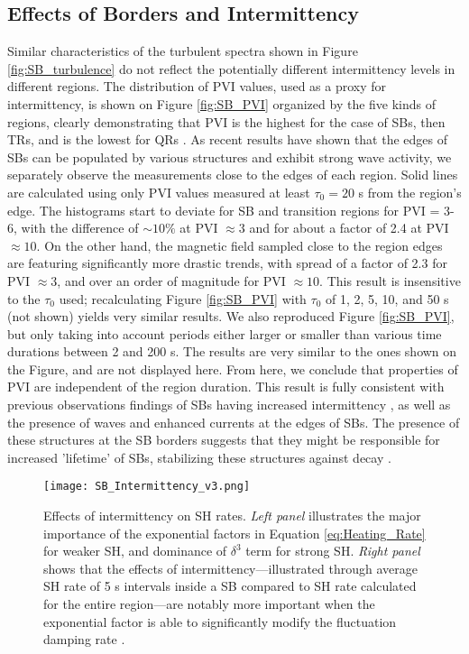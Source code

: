 \documentclass[]{aastex62}
\begin{document}
\subsection{Effects of Borders and Intermittency}
\label{sec:Results_Intermittency}

Similar characteristics of the turbulent spectra shown in Figure \ref{fig:SB_turbulence} do not reflect the potentially different intermittency levels in different regions. The distribution of PVI values, used as a proxy for intermittency, is shown on Figure \ref{fig:SB_PVI} organized by the five kinds of regions, clearly demonstrating that PVI is the highest for the case of SBs, then TRs, and is the lowest for QRs \citep{Huang_2020_A&A}. As recent results \citep{Krasnoselskikh_2020_ApJ,Agapitov_2020_ApJL,Farrell_2020_ApJS} have shown that the edges of SBs can be populated by various structures and exhibit strong wave activity, we separately observe the measurements close to the edges of each region. Solid lines are calculated using only PVI values measured at least $\tau_0 = 20$ s from the region's edge. The histograms start to deviate for SB and transition regions for PVI = 3-6, with the difference of $\sim 10\%$ at PVI $\approx 3$ and for about a factor of 2.4 at PVI $\approx 10$. On the other hand, the magnetic field sampled close to the region edges are featuring significantly more drastic trends, with spread of a factor of 2.3 for PVI $\approx 3$, and over an order of magnitude for PVI $\approx 10$. This result is insensitive to the $\tau_0$ used; recalculating Figure \ref{fig:SB_PVI} with $\tau_0$ of 1, 2, 5, 10, and 50 s (not shown) yields very similar results. We also reproduced Figure \ref{fig:SB_PVI}, but only taking into account periods either larger or smaller than various time durations between 2 and 200 s. The results are very similar to the ones shown on the Figure, and are not displayed here. From here, we conclude that properties of PVI are independent of the region duration. This result is fully consistent with previous observations findings of SBs having increased intermittency \citep{Horbury_2018_MNRAS}, as well as the presence of waves and enhanced currents at the edges of SBs. The presence of these structures at the SB borders suggests that they might be responsible for increased 'lifetime' of SBs, stabilizing these structures against decay \citep{Landi_2005_ApJ}.


\begin{figure}
\centering
\texttt{[image: SB\_Intermittency\_v3.png]}
\caption{Effects of intermittency on SH rates. \emph{Left panel} illustrates the major importance of the exponential factors in Equation \ref{eq:Heating_Rate} for weaker SH, and dominance of $\delta^3$ term for strong SH. \emph{Right panel} shows that the effects of intermittency---illustrated through average SH rate of 5 s intervals inside a SB compared to SH rate calculated for the entire region---are notably more important when the exponential factor is able to significantly modify the fluctuation damping rate \citep{Mallet_2019_JPP}.}
\label{fig:SB_SH_int}
\end{figure}
\end{document}
